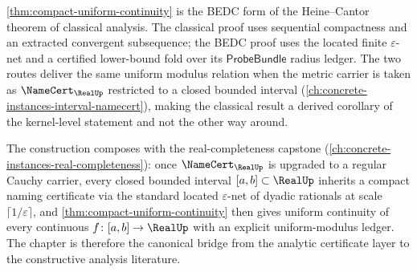 \begin{remark}
\label{rem:compact-uniform-heine-cantor}
\autoref{thm:compact-uniform-continuity} is the BEDC form of the Heine--Cantor theorem of classical analysis. The classical proof uses sequential compactness and an extracted convergent subsequence; the BEDC proof uses the located finite $\varepsilon$-net and a certified lower-bound fold over its $\mathsf{ProbeBundle}$ radius ledger. The two routes deliver the same uniform modulus relation when the metric carrier is taken as $\NameCert_{\RealUp}$ restricted to a closed bounded interval (\autoref{ch:concrete-instances-interval-namecert}), making the classical result a derived corollary of the kernel-level statement and not the other way around.
\end{remark}

\begin{remark}
\label{rem:compact-uniform-real-completeness-composition}
The construction composes with the real-completeness capstone (\autoref{ch:concrete-instances-real-completeness}): once $\NameCert_{\RealUp}$ is upgraded to a regular Cauchy carrier, every closed bounded interval $[a, b] \subset \RealUp$ inherits a compact naming certificate via the standard located $\varepsilon$-net of dyadic rationals at scale $\lceil 1/\varepsilon \rceil$, and \autoref{thm:compact-uniform-continuity} then gives uniform continuity of every continuous $f \colon [a, b] \to \RealUp$ with an explicit uniform-modulus ledger. The chapter is therefore the canonical bridge from the analytic certificate layer to the constructive analysis literature.
\end{remark}
